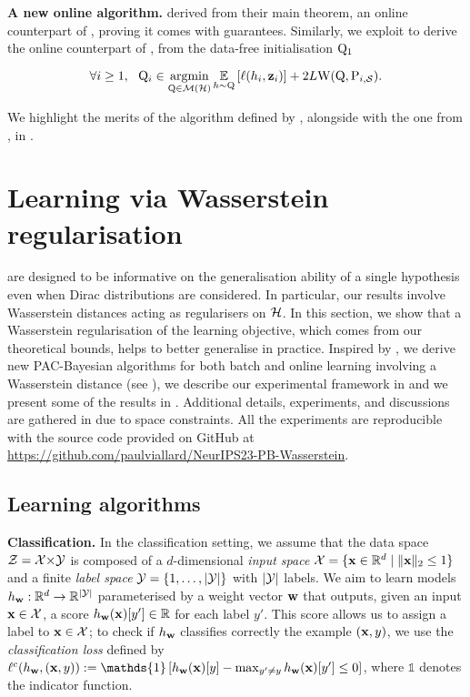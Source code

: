 \textbf{A new online algorithm.}
\cite{haddouche2022online} derived from their main theorem, an online counterpart of , proving it comes with guarantees.
Similarly, we exploit  to derive the online counterpart of , from the data-free initialisation $\mathrm{Q}_1$

\begin{equation}
    \label{eq:online-alg}
    \forall i \geq 1,\ \ \mathrm{Q}_i \in \operatorname*{\mathrm{argmin}}_{\mathrm{Q}\in\mathcal{M}(\mathcal{H})} \operatorname*{\mathbb{E}}_{h\sim \mathrm{Q}}\left[\ell(h_i, \mathbf{z}_i)\right] + 2L\mathrm{W}(\mathrm{Q}, \mathrm{P}_{i,\mathcal{S}}).
\end{equation}

We highlight the merits of the algorithm defined by , alongside with the one from , in .

\section{Learning via Wasserstein regularisation}
\label{sec:experiments}

 are designed to be informative on the generalisation ability of a single hypothesis even when Dirac distributions are considered.
In particular, our results involve Wasserstein distances acting as regularisers on $\mathcal{H}$. 
In this section, we show that a Wasserstein regularisation of the learning objective, which comes from our theoretical bounds, helps to better generalise in practice.
Inspired by , we derive new PAC-Bayesian algorithms for both batch and online learning involving a Wasserstein distance (see ), we describe our experimental framework in  and we present some of the results in .
Additional details, experiments, and discussions are gathered in  due to space constraints. 
All the experiments are reproducible with the source code provided on GitHub at \url{https://github.com/paulviallard/NeurIPS23-PB-Wasserstein}.

\subsection{Learning algorithms}
\label{sec:algo}

\textbf{Classification.} 
In the classification setting, we assume that the data space $\mathcal{Z}=\mathcal{X}{\times}\mathcal{Y}$ is composed of a $d$-dimensional \textit{input space} $\mathcal{X}=\{ \mathbf{x} \in \mathbb{R}^d \;|\; \|\mathbf{x}\|_2 \le 1 \}$ and a finite \textit{label space} $\mathcal{Y}=\{1,\dots, |\mathcal{Y}|\}$ with $|\mathcal{Y}|$ labels.
We aim to learn models $h_{\mathbf{w}}: \mathbb{R}^d\to \mathbb{R}^{|\mathcal{Y}|}$ parameterised by a weight vector $\mathbf{w}$ that outputs, given an input $\mathbf{x}\in\mathcal{X}$, a score $h_{\mathbf{w}}(\mathbf{x})[y'] \in \mathbb{R}$ for each label $y'$. 
This score allows us to assign a label to $\mathbf{x}\in\mathcal{X}$; to check if $h_{\mathbf{w}}$ classifies correctly the example $(\mathbf{x}, y)$, we use the {\it classification loss} defined by $\loss^{c}(h_{\wbf}, (\x, y)) \defeq \mathds{1}\left[ h_{\wbf}(\x)[y] - \max_{y'\ne y} h_{\wbf}(\x)[y'] \le 0 \right]$, where $\mathds{1}$ denotes the indicator function.

